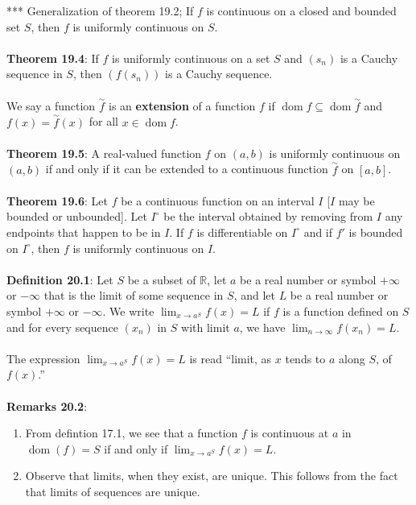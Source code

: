 \documentclass{article}
\theoremstyle{definition}
\DeclareMathOperator{\Dom}{dom}
\begin{document}
*** Generalization of theorem 19.2; If $f$ is continuous on a closed and bounded set $S$, then $f$ is uniformly continuous on $S$. \\ \\
\textbf{Theorem 19.4}: If $f$ is uniformly continuous on a set $S$ and $(s_n)$ is a Cauchy sequence in $S$, then $(f(s_n))$ is a Cauchy sequence. \\ \\
We say a function $\stackrel{\sim}{f}$ is an \textbf{extension} of a function $f$ if $\Dom{f} \subseteq \Dom{\stackrel{\sim}{f}}$ and $f(x) = \stackrel{\sim}{f}(x)$ for all $x \in \Dom{f}$. \\ \\
\textbf{Theorem 19.5}: A real-valued function $f$ on $(a, b)$ is uniformly continuous on $(a, b)$ if and only if it can be extended to a continuous function $\stackrel{\sim}{f}$ on $[a, b]$. \\ \\
\textbf{Theorem 19.6}: Let $f$ be a continuous function on an interval $I$ [$I$ may be bounded or unbounded]. Let $I^\circ$ be the interval obtained by removing from $I$ any endpoints that happen to be in $I$. If $f$ is differentiable on $I^\circ$ and if $f'$ is bounded on $I^\circ$, then $f$ is uniformly continuous on $I$. \\ \\
\textbf{Definition 20.1}: Let $S$ be a subset of $\mathbb{R}$, let $a$ be a real number or symbol $+\infty$ or $-\infty$ that is the limit of some sequence in $S$, and let $L$ be a real number or symbol $+\infty$ or $-\infty$. We write $\lim_{x \rightarrow a^S} f(x) = L$ if $f$ is a function defined on $S$ and for every sequence $(x_n)$ in $S$ with limit $a$, we have $\lim_{n \rightarrow \infty} f(x_n) = L$. \\ \\ 
The expression $\lim_{x \rightarrow a^S} f(x) = L$ is read ``limit, as $x$ tends to $a$ along $S$, of $f(x)$.'' \\ \\
\textbf{Remarks 20.2}: \begin{enumerate}
    \item From defintion 17.1, we see that a function $f$ is continuous at $a$ in $\Dom(f) = S$ if and only if $\lim_{x \rightarrow a^S} f(x) = L$. 
    \item Observe that limits, when they exist, are unique. This follows from the fact that limits of sequences are unique.
\end{enumerate} $ $ \\
\end{document}
